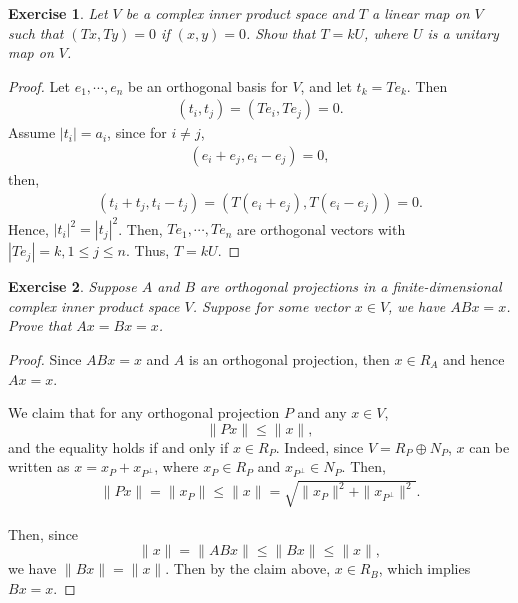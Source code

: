 \documentclass[11pt]{book}
\newtheorem{exercise}{Exercise}[section]
\theoremstyle{definition}
\numberwithin{equation}{chapter}
\begin{document}
\begin{exercise}{\bf *}
Let $V$ be a complex inner product space and $T$ a linear map on $V$ such that $(Tx, Ty) = 0$ if $(x,y) = 0$. Show that $T = kU$, where $U$ is a unitary map on $V$.
\end{exercise}
\begin{proof}
Let $e_1, \cdots, e_n$ be an orthogonal basis for $V$, and let $t_k = Te_k$. Then 
\begin{align*}
    (t_i, t_j) = (T e_i, T e_j) = 0.
\end{align*}
Assume $|t_i| = a_i$, since for $i \neq j$, 
\begin{align*}
    (e_i + e_j, e_i - e_j) = 0,
\end{align*}
then,
\begin{align*}
    (t_i + t_j, t_i - t_j) = (T(e_i + e_j), T(e_i - e_j)) = 0.
\end{align*}
Hence, $|t_i|^2 = |t_j|^2$. Then, $Te_1, \cdots, Te_n$ are orthogonal vectors with $|T e_j| = k, 1 \leq j \leq n$. Thus, $T = kU$.
\end{proof}

\medskip

\begin{exercise}{\rm *}
Suppose $A$ and $B$ are orthogonal projections in a finite-dimensional complex inner product space $V$. Suppose for some vector $x \in V$, we have
$ABx = x$. Prove that $Ax = Bx = x$.
\end{exercise}
\begin{proof}
Since $ABx = x$ and $A$ is an orthogonal projection, then $x \in R_A$ and hence $Ax = x$. 

We claim that for any orthogonal projection $P$ and any $x \in V$, 
$$\|Px\| \leq \|x\|,$$ 
and the equality holds if and only if $x \in R_P$. Indeed, since $V = R_P \oplus N_P$, $x$ can be written as $x = x_P + x_{P^\bot}$, where $x_P \in R_P$ and $x_{P^\bot} \in N_P$. Then,
\begin{align*}
    \|Px\| = \|x_P\| \leq \|x\| = \sqrt{\|x_P\|^2 + \|x_{P^\bot}\|^2}.
\end{align*}

Then, since 
$$\|x\| = \|ABx\| \leq \|Bx\| \leq \|x\|, $$
we have $\|Bx\| = \|x\|$. Then by the claim above, $x \in R_B$, which implies $Bx = x$.
\end{proof}

\medskip
\end{document}
